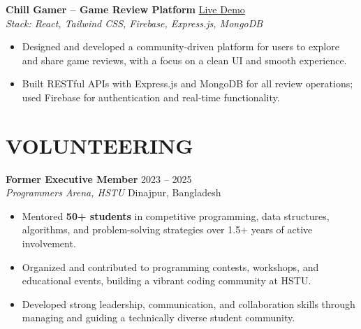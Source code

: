 \documentclass[10.5pt,a4paper]{article}
\begin{document}
\vspace{4pt}

\noindent\textbf{Chill Gamer -- Game Review Platform} \hfill \href{https://game-review-4919a.web.app/}{Live Demo} \\
\textit{Stack: React, Tailwind CSS, Firebase, Express.js, MongoDB}
\begin{itemize}
    \item Designed and developed a community-driven platform for users to explore and share game reviews, with a focus on a clean UI and smooth experience.
    \item Built RESTful APIs with Express.js and MongoDB for all review operations; used Firebase for authentication and real-time functionality.
\end{itemize}

\vspace{1pt}

\section*{VOLUNTEERING}
\vspace{4pt}
\noindent\textbf{Former Executive Member} \hfill 2023 -- 2025 \\
\textit{Programmers Arena, HSTU} \hfill Dinajpur, Bangladesh
\begin{itemize}
    \item Mentored \textbf{50+ students} in competitive programming, data structures, algorithms, and problem-solving strategies over 1.5+ years of active involvement.
    \item Organized and contributed to programming contests, workshops, and educational events, building a vibrant coding community at HSTU.
    \item Developed strong leadership, communication, and collaboration skills through managing and guiding a technically diverse student community.
\end{itemize}
\end{document}
